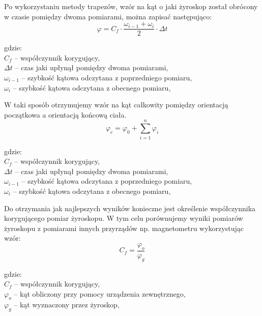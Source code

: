 Po wykorzystaniu metody trapezów, wzór na kąt o jaki żyroskop został obrócony w czasie pomiędzy dwoma pomiarami, można zapisać następująco:
\begin{equation}
  \varphi = C_{f} \cdot \frac{\omega_{i-1} + \omega_{i}}{2} \cdot \Delta t
\end{equation}
\begin{tabbing}
  gdzie: \= \\
    \> $C_{f}$ -- współczynnik korygujący, \\
    \> $\Delta t$ -- czas jaki upłynął pomiędzy dwoma pomiarami,\\
    \> $\omega_{i-1}$ -- szybkość kątowa odczytana z poprzedniego pomiaru,\\
    \> $\omega_{i}$ -- szybkość kątowa odczytana z obecnego pomiaru,\\
\end{tabbing}

W taki sposób otrzymujemy wzór na kąt całkowity pomiędzy orientacją początkowa a orientacją końcową ciała.
\begin{equation}
  \varphi_{c} = \varphi_{0} + \sum_{i=1}^{n} \varphi_{i} 
\end{equation}
\begin{tabbing}
  gdzie: \= \\
    \> $C_{f}$ -- współczynnik korygujący, \\
    \> $\Delta t$ -- czas jaki upłynął pomiędzy dwoma pomiarami,\\
    \> $\omega_{i-1}$ -- szybkość kątowa odczytana z poprzedniego pomiaru,\\
    \> $\omega_{i}$ -- szybkość kątowa odczytana z obecnego pomiaru,\\
\end{tabbing}

Do otrzymania jak najlepszych wyników konieczne jest określenie współczynnika korygującego pomiar żyroskopu.
W tym celu porównujemy wyniki pomiarów żyroskopu z pomiarami innych przyrządów np. magnetometru wykorzystując wzór:
\begin{equation}
  C_{f} = \frac{\varphi_{o}}{\varphi_{g}}
\end{equation}
\begin{tabbing}
  gdzie: \= \\
    \> $C_{f}$ -- współczynnik korygujący, \\
    \> $\varphi_{o}$ -- kąt obliczony przy pomocy urządzenia zewnętrznego,\\
    \> $\varphi_{g}$ -- kąt wyznaczony przez żyroskop,\\
\end{tabbing}

